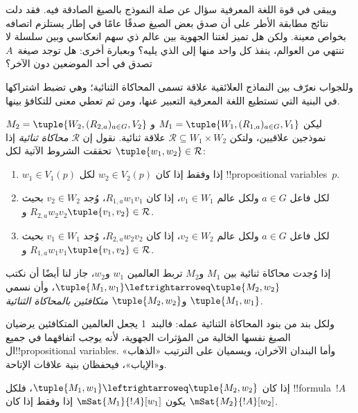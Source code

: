 \documentclass[../../../include/open-logic-section]{subfiles}
\begin{document}


ويبقى في قوة اللغة المعرفية سؤال عن صلة النموذج بالصيغ الصادقة فيه. فقد
دلت نتائج مطابقة الأطر على أن صدق بعض الصيغ صدقًا عامًا في إطار يستلزم
اتصافه بخواص معينة. ولكن هل تميز لغتنا الجهوية بين عالم ذي سهم انعكاسي
وبين سلسلة لا تنتهي من العوالم، ينفذ كل واحد منها إلى الذي يليه؟ وبعبارة
أخرى: هل توجد صيغة~$A$ تصدق في أحد الموضعين دون الآخر؟

وللجواب نعرّف بين النماذج العلائقية علاقة تسمى المحاكاة الثنائية؛ وهي
تضبط اشتراكها في البنية التي تستطيع اللغة المعرفية التعبير عنها، ومن ثم
تعطي معنى للتكافؤ بينها.

\begin{defn}
ليكن $M_1 = \tuple{W_1,(R_{1,a})_{a \in G},V_1}$ و
$M_2 = \tuple{W_2,(R_{2,a})_{a \in G},V_2}$ نموذجين علاقيين، ولتكن
$\mathcal{R} \subseteq W_1 \times W_2$ علاقة ثنائية. نقول إن
$\mathcal{R}$ \emph{محاكاة ثنائية} إذا تحققت الشروط الآتية لكل
$\tuple{w_1, w_2} \in \mathcal{R}$:

\begin{enumerate}
  \item $w_1 \in V_1(p)$ إذا وفقط إذا كان $w_2 \in V_2(p)$ لكل
  !!{propositional variable}s~$p$.
  \item لكل فاعل $a \in G$ ولكل عالم $v_1 \in W_1$، إذا كان
  $R_{1,a} w_1 v_1$، وُجد $v_2 \in W_2$ بحيث
  $R_{2,a} w_2 v_2$ و$\tuple{v_1, v_2} \in
  \mathcal{R}$.
  \item لكل فاعل $a \in G$ ولكل عالم $v_2 \in W_2$، إذا كان
   $R_{2,a} w_2 v_2$، وُجد $v_1 \in W_1$ بحيث
   $R_{1,a} w_1 v_1$ و$\tuple{v_1, v_2} \in
   \mathcal{R}$.
\end{enumerate}

إذا وُجدت محاكاة ثنائية بين $M_1$ و$M_2$ تربط العالمين $w_1$
و$w_2$، جاز لنا أيضًا أن نكتب
$\tuple{M_1, w_1} \leftrightarroweq \tuple{M_2, w_2}$، وأن نسمي
$\tuple{M_1, w_1}$ و$\tuple{M_2, w_2}$ \emph{متكافئين بالمحاكاة
الثنائية}.
\end{defn}

ولكل بند من بنود المحاكاة الثنائية عمله: فالبند~1 يجعل العالمين المتكافئين
يرضيان الصيغ نفسها الخالية من المؤثرات الجهوية، لأنه يوجب اتفاقهما في جميع
ال!!{propositional variable}s. وأما البندان الآخران، ويسميان على الترتيب
«الذهاب» و«الإياب»، فيحفظان بنية علاقات الإتاحة.

\begin{thm}
إذا كان $\tuple{M_1, w_1} \leftrightarroweq \tuple{M_2, w_2}$، فلكل
!!{formula}~$!A$ يكون $\mSat{M_1}{!A}[w_1]$ إذا وفقط إذا كان
$\mSat{M_2}{!A}[w_2]$.
\end{thm}
\end{document}
